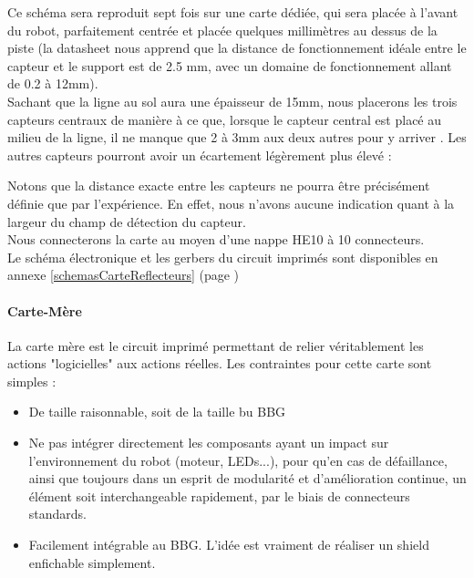 			Ce schéma sera reproduit sept fois sur une carte dédiée, qui sera placée à l'avant du robot, parfaitement centrée et placée quelques millimètres au dessus de la piste (la datasheet nous apprend que la distance de fonctionnement idéale entre le capteur et le support est de 2.5 mm, avec un domaine de fonctionnement allant de 0.2 à 12mm).\\
			
			Sachant que la ligne au sol aura une épaisseur de 15mm, nous placerons les trois capteurs centraux de manière à ce que, lorsque le capteur central est placé au milieu de la ligne, il ne manque que 2 à 3mm aux deux autres pour y arriver . Les autres capteurs pourront avoir un écartement légèrement plus élevé :


			Notons que la distance exacte entre les capteurs ne pourra être précisément définie que par l'expérience. En effet, nous n'avons aucune indication quant à la largeur du champ de détection du capteur.\\

			Nous connecterons la carte au moyen d'une nappe HE10 à 10 connecteurs.\\

			Le schéma électronique et les gerbers du circuit imprimés sont disponibles en annexe \ref{schemasCarteReflecteurs} (page \pageref{schemasCarteReflecteurs})

		\paragraph{Carte-Mère}\label{carteMere}

			La carte mère est le circuit imprimé permettant de relier véritablement les actions "logicielles" aux actions réelles. Les contraintes pour cette carte sont simples :
			\begin{itemize}
				\item De taille raisonnable, soit de la taille bu BBG
				\item Ne pas intégrer directement les composants ayant un impact sur l'environnement du robot (moteur, LEDs...), pour qu'en cas de défaillance, ainsi que toujours dans un esprit de modularité et d'amélioration continue, un élément soit interchangeable rapidement, par le biais de connecteurs standards.
				\item Facilement intégrable au BBG. L'idée est vraiment de réaliser un shield enfichable simplement.
			\end{itemize}
			

